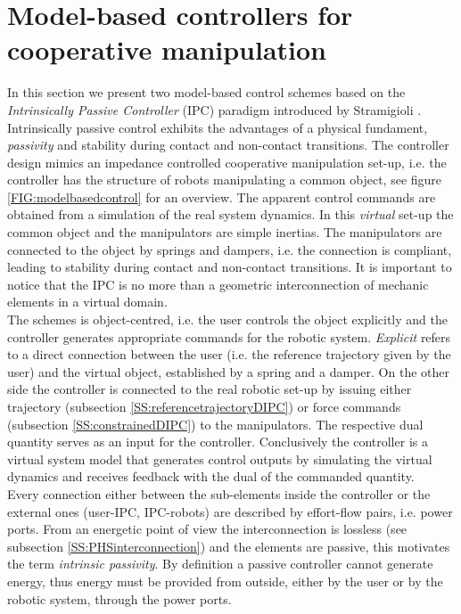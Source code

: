 \documentclass[a4paper,twoside, openright,12pt]{report}
\begin{document}
\section{Model-based controllers for cooperative manipulation}\label{S:modelbasedcontrol}
In this section we present two model-based control schemes based on the \emph{Intrinsically Passive Controller} (IPC) paradigm introduced by Stramigioli \cite{Stramigioli_01}. Intrinsically passive control exhibits the advantages of a physical fundament, \emph{passivity} and stability during contact and non-contact transitions. 
The controller design mimics an impedance controlled cooperative manipulation set-up, i.e. the controller has the structure of robots manipulating a common object, see figure \ref{FIG:modelbasedcontrol} for an overview. The apparent control commands are obtained from a simulation of the real system dynamics. In this \emph{virtual} set-up the common object and the manipulators are simple inertias. The manipulators are connected to the object by springs and dampers, i.e. the connection is compliant, leading to stability during contact and non-contact transitions. It is important to notice that the IPC is no more than a geometric interconnection of mechanic elements in a virtual domain.\\
 The schemes is object-centred, i.e. the user controls the object explicitly and the controller generates appropriate commands for the robotic system. \emph{Explicit} refers to a direct connection between the user (i.e. the reference trajectory given by the user) and the virtual object, established by a spring and a damper. On the other side the controller is connected to the real robotic set-up by issuing either trajectory (subsection \ref{SS:referencetrajectoryDIPC}) or force commands (subsection \ref{SS:constrainedDIPC}) to the manipulators. The respective dual quantity serves as an input for the controller. Conclusively the controller is a virtual system model that generates control outputs by simulating the virtual dynamics and receives feedback with the dual of the commanded quantity.\\
Every connection either between the sub-elements inside the controller or the external ones (user-IPC, IPC-robots) are described by effort-flow pairs, i.e. power ports. From an energetic point of view the interconnection is lossless (see subsection \ref{SS:PHSinterconnection}) and the elements are passive, this motivates the term \emph{intrinsic passivity}. By definition a passive controller cannot generate energy, thus energy must be provided from outside, either by the user or by the robotic system, through the power ports. 
\end{document}
